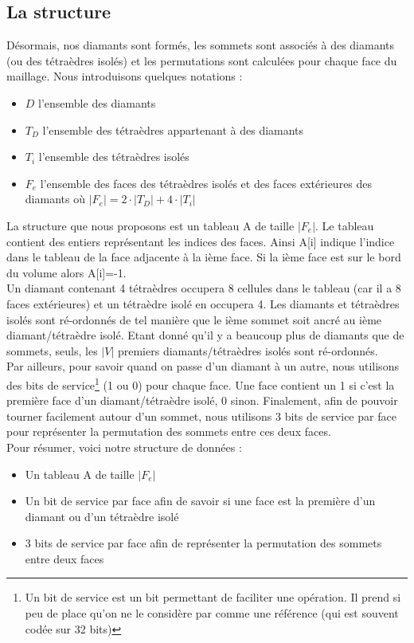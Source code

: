 \subsection{La structure}
\noindent
Désormais, nos diamants sont formés, les sommets sont associés à des diamants (ou des tétraèdres isolés) et les permutations sont calculées pour chaque face du maillage. Nous introduisons quelques notations :
\begin{itemize}
\item $D$ l'ensemble des diamants
\item $T_D$ l'ensemble des tétraèdres appartenant à des diamants
\item $T_i$ l'ensemble des tétraèdres isolés
\item $F_e$ l'ensemble des faces des tétraèdres isolés et des faces extérieures des diamants où $|F_e|=2\cdot |T_D|+4\cdot |T_i|$\\
\end{itemize}
\noindent
La structure que nous proposons est un tableau A de taille $|F_e|$. Le tableau contient des entiers représentant les indices des faces. Ainsi A[i] indique l'indice dans le tableau de la face adjacente à la ième face. Si la ième face est sur le bord du volume alors A[i]=-1.\\ 
Un diamant contenant 4 tétraèdres occupera 8 cellules dans le tableau (car il a 8 faces extérieures) et un tétraèdre isolé en occupera 4. Les diamants et tétraèdres isolés sont ré-ordonnés de tel manière que le ième sommet soit ancré au ième diamant/tétraèdre isolé. Etant donné qu'il y a beaucoup plus de diamants que de sommets, seuls, les $|V|$ premiers diamants/tétraèdres isolés sont ré-ordonnés.\\
Par ailleurs, pour savoir quand on passe d'un diamant à un autre, nous utilisons des bits de service\footnote{Un bit de service est un bit permettant de faciliter une opération. Il prend si peu de place qu'on ne le considère par comme une référence (qui est souvent codée sur 32 bits)} (1 ou 0) pour chaque face. Une face contient un 1 si c'est la première face d'un diamant/tétraèdre isolé, 0 sinon. Finalement, afin de pouvoir tourner facilement autour d'un sommet, nous utilisons 3 bits de service par face pour représenter la permutation des sommets entre ces deux faces.\\
Pour résumer, voici notre structure de données :
\begin{itemize}
\item Un tableau A de taille $|F_e|$
\item Un bit de service par face afin de savoir si une face est la première d'un diamant ou d'un tétraèdre isolé
\item 3 bits de service par face afin de représenter la permutation des sommets entre deux faces
\end{itemize}
